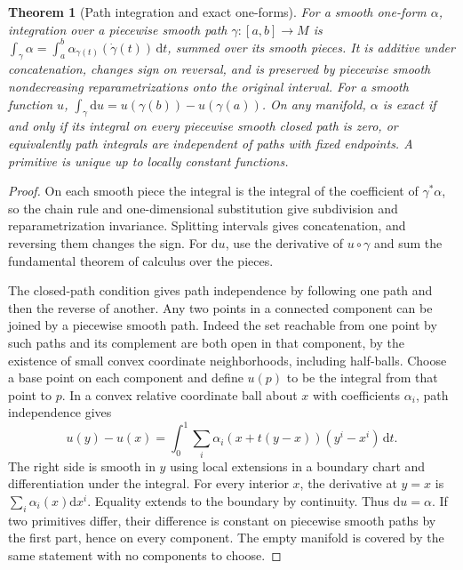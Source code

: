\documentclass[11pt,oneside,openany]{book}
\newtheorem{theorem}{Theorem}[chapter]
\theoremstyle{definition}
\theoremstyle{remark}
\newcommand{\dd}{\mathrm d}
\begin{document}
\begin{theorem}[Path integration and exact one-forms]
\label{p104:M07.05}
For a smooth one-form \(\alpha\), integration over a piecewise smooth path \(\gamma:[a,b]\to M\) is
\(\int_\gamma\alpha=\int_a^b\alpha_{\gamma(t)}(\dot\gamma(t))\,\dd t\), summed over its smooth pieces. It is additive under concatenation, changes sign on reversal, and is preserved by piecewise smooth nondecreasing reparametrizations onto the original interval. For a smooth function \(u\), \(\int_\gamma\dd u=u(\gamma(b))-u(\gamma(a))\). On any manifold, \(\alpha\) is exact if and only if its integral on every piecewise smooth closed path is zero, or equivalently path integrals are independent of paths with fixed endpoints. A primitive is unique up to locally constant functions.
\end{theorem}

\begin{proof}
On each smooth piece the integral is the integral of the coefficient of \(\gamma^*\alpha\), so the chain rule and one-dimensional substitution give subdivision and reparametrization invariance. Splitting intervals gives concatenation, and reversing them changes the sign. For \(\dd u\), use the derivative of \(u\circ\gamma\) and sum the fundamental theorem of calculus over the pieces.

The closed-path condition gives path independence by following one path and then the reverse of another. Any two points in a connected component can be joined by a piecewise smooth path. Indeed the set reachable from one point by such paths and its complement are both open in that component, by the existence of small convex coordinate neighborhoods, including half-balls. Choose a base point on each component and define \(u(p)\) to be the integral from that point to \(p\). In a convex relative coordinate ball about \(x\) with coefficients \(\alpha_i\), path independence gives
\[
 u(y)-u(x)
 =\int_0^1\sum_i \alpha_i(x+t(y-x))(y^i-x^i)\,\dd t .
\]
The right side is smooth in \(y\) using local extensions in a boundary chart and differentiation under the integral. For every interior \(x\), the derivative at \(y=x\) is \(\sum_i\alpha_i(x)\dd x^i\). Equality extends to the boundary by continuity. Thus \(\dd u=\alpha\). If two primitives differ, their difference is constant on piecewise smooth paths by the first part, hence on every component. The empty manifold is covered by the same statement with no components to choose.
\end{proof}
\end{document}

